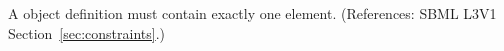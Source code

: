 A \Constraint object definition must contain exactly one 
element.  (References: SBML L3V1 Section~\ref{sec:constraints}.)
